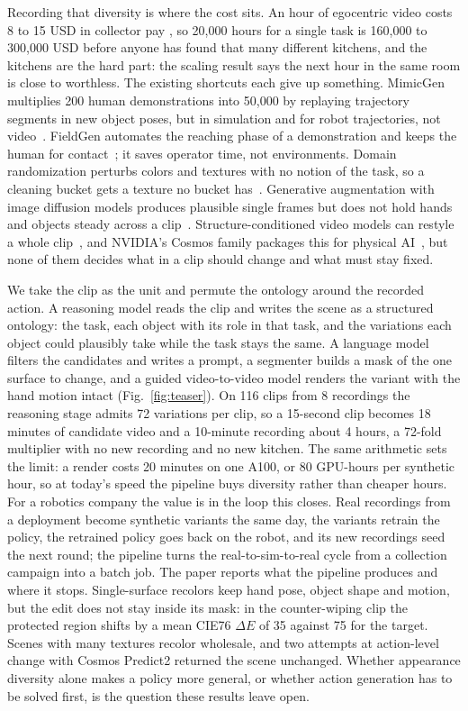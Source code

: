 Recording that diversity is where the cost sits. An hour of egocentric video costs 8 to 15 USD in collector pay , so 20,000 hours for a single task is 160,000 to 300,000 USD before anyone has found that many different kitchens, and the kitchens are the hard part: the scaling result says the next hour in the same room is close to worthless. The existing shortcuts each give up something. MimicGen multiplies 200 human demonstrations into 50,000 by replaying trajectory segments in new object poses, but in simulation and for robot trajectories, not video~\cite{mimicgen}. FieldGen automates the reaching phase of a demonstration and keeps the human for contact~\cite{fieldgen}; it saves operator time, not environments. Domain randomization perturbs colors and textures with no notion of the task, so a cleaning bucket gets a texture no bucket has~\cite{tobin2017}. Generative augmentation with image diffusion models produces plausible single frames but does not hold hands and objects steady across a clip~\cite{rosie,genaug}. Structure-conditioned video models can restyle a whole clip~\cite{gen1,controlnet}, and NVIDIA's Cosmos family packages this for physical AI~\cite{cosmos2025}, but none of them decides what in a clip should change and what must stay fixed.

We take the clip as the unit and permute the ontology around the recorded action. A reasoning model reads the clip and writes the scene as a structured ontology: the task, each object with its role in that task, and the variations each object could plausibly take while the task stays the same. A language model filters the candidates and writes a prompt, a segmenter builds a mask of the one surface to change, and a guided video-to-video model renders the variant with the hand motion intact (Fig.~\ref{fig:teaser}). On 116 clips from 8 recordings the reasoning stage admits 72 variations per clip, so a 15-second clip becomes 18 minutes of candidate video and a 10-minute recording about 4 hours, a 72-fold multiplier with no new recording and no new kitchen. The same arithmetic sets the limit: a render costs 20 minutes on one A100, or 80 GPU-hours per synthetic hour, so at today's speed the pipeline buys diversity rather than cheaper hours. For a robotics company the value is in the loop this closes. Real recordings from a deployment become synthetic variants the same day, the variants retrain the policy, the retrained policy goes back on the robot, and its new recordings seed the next round; the pipeline turns the real-to-sim-to-real cycle from a collection campaign into a batch job. The paper reports what the pipeline produces and where it stops. Single-surface recolors keep hand pose, object shape and motion, but the edit does not stay inside its mask: in the counter-wiping clip the protected region shifts by a mean CIE76 $\Delta E$ of 35 against 75 for the target. Scenes with many textures recolor wholesale, and two attempts at action-level change with Cosmos Predict2 returned the scene unchanged. Whether appearance diversity alone makes a policy more general, or whether action generation has to be solved first, is the question these results leave open.
